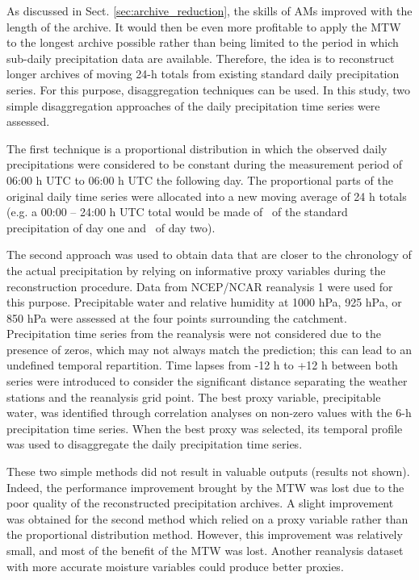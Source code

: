 \documentclass[hess, manuscript]{copernicus}
\begin{document}
	As discussed in Sect. \ref{sec:archive_reduction}, the skills of AMs improved with the length of the archive. It would then be even more profitable to apply the MTW to the longest archive possible rather than being limited to the period in which sub-daily precipitation data are available. Therefore, the idea is to reconstruct longer archives of moving 24-h totals from existing standard daily precipitation series. For this purpose, disaggregation techniques can be used. In this study, two simple disaggregation approaches of the daily precipitation time series were assessed.
	
	The first technique is a proportional distribution in which the observed daily precipitations were considered to be constant during the measurement period of 06:00 h UTC to 06:00 h UTC the following day. The proportional parts of the original daily time series were allocated into a new moving average of 24 h totals (e.g. a 00:00 -- 24:00 h UTC total would be made of \textonequarter\ of the standard precipitation of day one and \textthreequarters\ of day two). 
	
	The second approach was used to obtain data that are closer to the chronology of the actual precipitation by relying on informative proxy variables during the reconstruction procedure. Data from NCEP/NCAR reanalysis 1 were used for this purpose. Precipitable water and relative humidity at 1000 hPa, 925 hPa, or 850 hPa were assessed at the four points surrounding the catchment. Precipitation time series from the reanalysis were not considered due to the presence of zeros, which may not always match the prediction; this can lead to an undefined temporal repartition. Time lapses from -12 h to +12 h between both series were introduced to consider the significant distance separating the weather stations and the reanalysis grid point. The best proxy variable, precipitable water, was identified through correlation analyses on non-zero values with the 6-h precipitation time series. When the best proxy was selected, its temporal profile was used to disaggregate the daily precipitation time series.
	
	These two simple methods did not result in valuable outputs (results not shown). Indeed, the performance improvement brought by the MTW was lost due to the poor quality of the reconstructed precipitation archives. A slight improvement was obtained for the second method which relied on a proxy variable rather than the proportional distribution method. However, this  improvement was relatively small, and most of the benefit of the MTW was lost. Another reanalysis dataset with more accurate moisture variables could produce better proxies.
	
\end{document}
